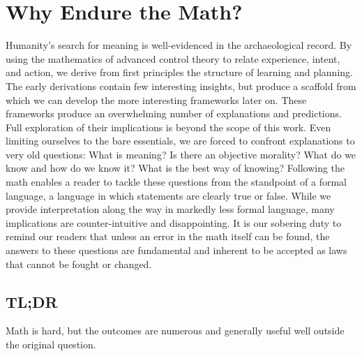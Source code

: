 \documentclass[10pt]{article}
\begin{document}
\section*{Why Endure the Math?}
Humanity's search for meaning is well-evidenced in the archaeological record. By using the mathematics of advanced control theory to relate experience, intent, and action, we derive from first principles the structure of learning and planning. The early derivations contain few interesting insights, but produce a scaffold from which we can develop the more interesting frameworks later on. These frameworks produce an overwhelming number of explanations and predictions. Full exploration of their implications is beyond the scope of this work. Even limiting ourselves to the bare essentials, we are forced to confront explanations to very old questions: What is meaning? Is there an objective morality? What do we know and how do we know it? What is the best way of knowing? Following the math enables a reader to tackle these questions from the standpoint of a formal language, a language in which statements are clearly true or false. While we provide interpretation along the way in markedly less formal language, many implications are counter-intuitive and disappointing. It is our sobering duty to remind our readers that unless an error in the math itself can be found, the answers to these questions are fundamental and inherent to be accepted as laws that cannot be fought or changed.

\subsection*{TL;DR}
Math is hard, but the outcomes are numerous and generally useful well outside the original question.
\end{document}
